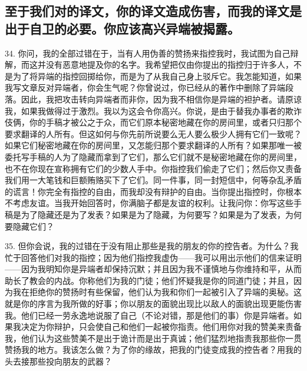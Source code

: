 
\subsection{至于我们对的译文，你的译文造成伤害，而我的译文是出于自卫的必要。你应该高兴异端被揭露。}

34. 你问，我的全部过错在于，当有人用伪善的赞扬来指控我时，我试图为自己辩解，而这并没有恶意地提及你的名字。我希望把仅由你提出的指控归于许多人，不是为了将异端的指控回掷给你，而是为了从我自己身上驳斥它。我怎能知道，如果我写文章反对异端者，你会生气呢？你曾说过，你已经从的著作中删除了异端段落。因此，我把攻击转向异端者而非你，因为我不相信你是异端的袒护者。请原谅我，如果我做得过于激烈。我以为这会令你高兴。你说，是由于替我办事者的欺诈伎俩，你的手稿才被公之于众，而它们原本秘密地藏在你的房间里，或者只归那个要求翻译的人所有。但这如何与你先前所说要么无人要么极少人拥有它们一致呢？如果它们秘密地藏在你的房间里，又怎能归那个要求翻译的人所有？如果那唯一被委托写手稿的人为了隐藏而拿到了它们，那么它们就不是秘密地藏在你的房间里，也不在你现在宣称拥有它们的少数人手中。你指控我们偷走了它们；然后你又责备我们用一大笔钱和巨额贿赂买下了它们。同一件事，同一封短信中，何等杂乱矛盾的谎言！你完全有指控的自由，而我却没有辩护的自由。当你提出指控时，你根本不考虑友谊。当我开始回答时，你满脑子都是友谊的权利。让我问你：你写这些手稿是为了隐藏还是为了发表？如果是为了隐藏，为何要写？如果是为了发表，为何要隐藏它们？\par

35. 但你会说，我的过错在于没有阻止那些是我的朋友的你的控告者。为什么？我忙于回答他们对我的指控；因为他们指控我虚伪——我可以用出示他们的信来证明——因为我明知你是异端者却保持沉默；并且因为我不谨慎地与你维持和平，从而助长了教会的内战。你称他们为我的门徒；他们怀疑我是你的同道门徒；并且，因为我在拒绝你的赞扬时有些保留，他们认为我和你们一起被引入了异端的奥秘。这就是你的序言为我所做的好事；你以朋友的面貌出现比以敌人的面貌出现更能伤害我。他们已经一劳永逸地说服了自己（不论对错，那是他们的事）你是异端者。如果我决定为你辩护，只会使自己和他们一起被你指责。他们用你对我的赞美来责备我，他们认为这些赞美不是出于诡计而是出于真诚；他们猛烈地指责我那些你一贯赞扬我的地方。我该怎么做？为了你的缘故，把我的门徒变成我的控告者？用我的头去接那些投向朋友的武器？\par

